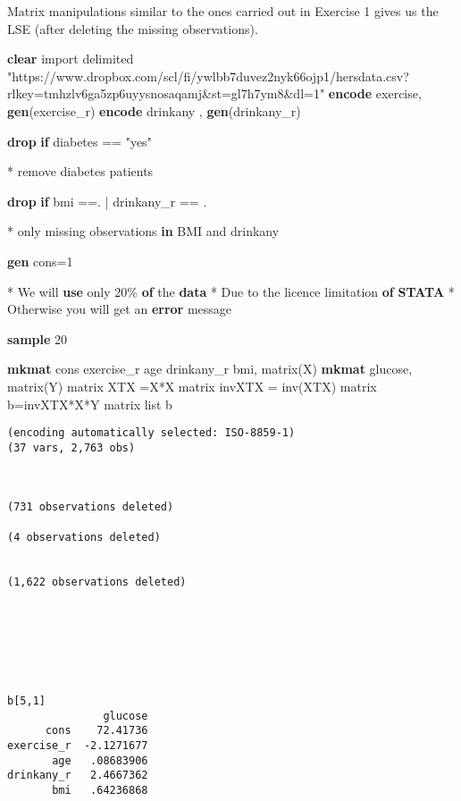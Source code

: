 \documentclass[
  letterpaper,
  DIV=11,
  numbers=noendperiod]{scrreprt}
\newenvironment{Shaded}{\begin{snugshade}}{\end{snugshade}}
\newcommand{\FunctionTok}[1]{\textcolor[rgb]{0.28,0.35,0.67}{#1}}
\newcommand{\KeywordTok}[1]{\textcolor[rgb]{0.00,0.23,0.31}{\textbf{#1}}}
\newcommand{\NormalTok}[1]{\textcolor[rgb]{0.00,0.23,0.31}{#1}}
\newcommand{\OtherTok}[1]{\textcolor[rgb]{0.00,0.23,0.31}{#1}}
\newcommand{\StringTok}[1]{\textcolor[rgb]{0.13,0.47,0.30}{#1}}
\begin{document}
Matrix manipulations similar to the ones carried out in Exercise 1 gives
us the LSE (after deleting the missing observations).

\begin{Shaded}
\begin{Highlighting}[]
\KeywordTok{clear}
\NormalTok{import delimited }\StringTok{"https://www.dropbox.com/scl/fi/ywlbb7duvez2nyk66ojp1/hersdata.csv?rlkey=tmhzlv6ga5zp6uyysnosaqamj\&st=gl7h7ym8\&dl=1"}
\KeywordTok{encode}\NormalTok{  exercise, }\KeywordTok{gen}\NormalTok{(exercise\_r)}
\KeywordTok{encode}\NormalTok{ drinkany , }\KeywordTok{gen}\NormalTok{(drinkany\_r)}

\KeywordTok{drop} \KeywordTok{if}\NormalTok{ diabetes == }\StringTok{"yes"}

\NormalTok{* remove diabetes patients}

\KeywordTok{drop} \KeywordTok{if}\NormalTok{ bmi ==. | drinkany\_r == . }

\NormalTok{* only }\FunctionTok{missing}\NormalTok{ observations }\KeywordTok{in}\NormalTok{ BMI and drinkany}

\KeywordTok{gen}\NormalTok{ cons=1}

\NormalTok{* We will }\KeywordTok{use}\NormalTok{ only 20\% }\KeywordTok{of}\NormalTok{ the }\KeywordTok{data}
\NormalTok{* Due to the licence limitation }\KeywordTok{of} \KeywordTok{STATA}
\NormalTok{* Otherwise you will }\FunctionTok{get}\NormalTok{ an }\KeywordTok{error}\NormalTok{ message}

\KeywordTok{sample}\NormalTok{ 20}


\KeywordTok{mkmat}\NormalTok{ cons exercise\_r age drinkany\_r bmi, }\FunctionTok{matrix}\NormalTok{(X) }
\KeywordTok{mkmat}\NormalTok{ glucose, }\FunctionTok{matrix}\NormalTok{(Y)}
\FunctionTok{matrix}\NormalTok{ XTX =X\textquotesingle{}*X}
\FunctionTok{matrix}\NormalTok{ invXTX = }\FunctionTok{inv}\NormalTok{(XTX)}
\FunctionTok{matrix}\NormalTok{ b=invXTX*X\textquotesingle{}*Y}
\FunctionTok{matrix} \OtherTok{list}\NormalTok{ b }
\end{Highlighting}
\end{Shaded}

\begin{verbatim}
(encoding automatically selected: ISO-8859-1)
(37 vars, 2,763 obs)



(731 observations deleted)

(4 observations deleted)


(1,622 observations deleted)







b[5,1]
               glucose
      cons    72.41736
exercise_r  -2.1271677
       age   .08683906
drinkany_r   2.4667362
       bmi   .64236868
\end{verbatim}
\end{document}
